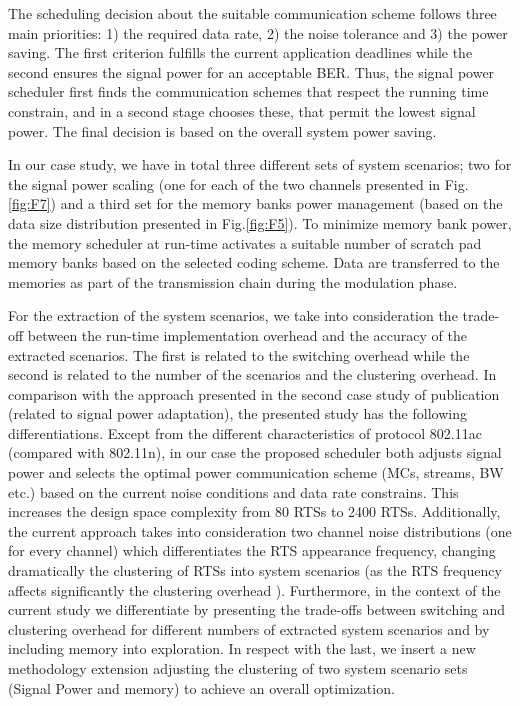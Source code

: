 The scheduling decision about the suitable communication scheme follows three main priorities: 1) the required data rate, 2) the noise tolerance and 3) the power saving. The first criterion fulfills the current application deadlines while the second ensures the signal power for an acceptable BER. Thus, the signal power scheduler first finds the communication schemes that respect the running time constrain, and in a second stage chooses these, that permit the lowest signal power. The final decision is based on the overall system power saving. 

In our case study, we have in total three different sets of system scenarios; two for the signal power scaling (one for each of the two channels presented in Fig.\ref{fig:F7}) and a third set for the memory banks power management (based on the data size distribution presented in Fig.\ref{fig:F5}). To minimize memory bank power, the memory scheduler at run-time activates a suitable number of scratch pad memory banks based on the selected coding scheme. Data are transferred to the memories as part of the transmission chain during the modulation phase.
	
For the extraction of the system scenarios, we take into consideration the trade-off between the run-time implementation overhead and the accuracy of the extracted scenarios. The first is related to the switching overhead while the second is related to the number of the scenarios and the clustering overhead. In comparison with the approach presented in the second case study of publication \cite{21} (related to signal power adaptation), the presented study has the following differentiations. Except from the different characteristics of protocol 802.11ac (compared with 802.11n), in our case the proposed scheduler both adjusts signal power and selects the optimal power communication scheme (MCs, streams, BW etc.) based on the current noise conditions and data rate constrains. This increases the design space complexity from 80 RTSs \cite{21} to 2400 RTSs. Additionally, the current approach takes into consideration two channel noise distributions (one for every channel) which differentiates the RTS appearance frequency, changing dramatically the clustering of RTSs into system scenarios (as the RTS frequency affects significantly the clustering overhead \cite{21}). Furthermore, in the context of the current study we differentiate by presenting the trade-offs between switching and clustering overhead for different numbers of extracted system scenarios and by including memory into exploration. In respect with the last, we insert a new methodology extension adjusting the clustering of two system scenario sets (Signal Power and memory) to achieve an overall optimization.  
	
